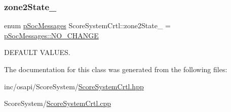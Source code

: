 \subsubsection{\texorpdfstring{zone2\+State\+\_\+}{zone2State\_}}
{\footnotesize\ttfamily enum \hyperlink{_score_system_crtl_8hpp_a5561f3e128877a8ec1313455605a2c92}{p\+Soc\+Messages} Score\+System\+Crtl\+::zone2\+State\+\_\+ = \hyperlink{_score_system_crtl_8hpp_a5561f3e128877a8ec1313455605a2c92a7fb0c1cca10ff57ae7aa3878ba530fbd}{p\+Soc\+Messages\+::\+N\+O\+\_\+\+C\+H\+A\+N\+GE}\hspace{0.3cm}{\ttfamily [private]}}



D\+E\+F\+A\+U\+LT V\+A\+L\+U\+ES. 



The documentation for this class was generated from the following files\+:\begin{DoxyCompactItemize}
\item 
inc/osapi/\+Score\+System/\hyperlink{_score_system_crtl_8hpp}{Score\+System\+Crtl.\+hpp}\item 
Score\+System/\hyperlink{_score_system_crtl_8cpp}{Score\+System\+Crtl.\+cpp}\end{DoxyCompactItemize}
